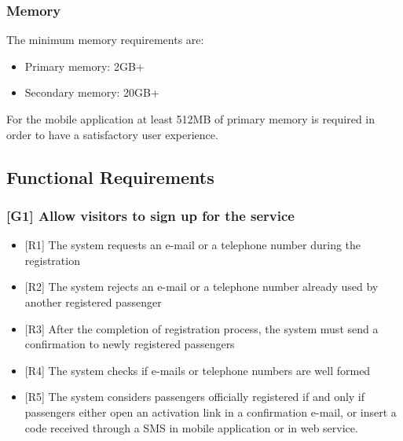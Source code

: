 \documentclass[a4paper,12pt]{article}%
\begin{document}
\subsubsection{Memory}
The minimum memory requirements are:
\begin{itemize}
\item Primary memory: 2GB+
\item Secondary memory: 20GB+
\end{itemize}
For the mobile application at least 512MB of primary memory is required in order to have a satisfactory user experience.
\subsection{Functional Requirements}
\subsubsection{{[}G1{]} Allow visitors to sign up for the service}
\label{goal1}
\begin{itemize}
\item {[}R1{]} The system requests an e-mail or a telephone number during the registration
\item {[}R2{]} The system rejects an e-mail or a telephone number already used by another registered passenger
\item {[}R3{]} After the completion of registration process, the system must send a confirmation to newly registered passengers
\item {[}R4{]} The system checks if e-mails or telephone numbers are well formed
\item {[}R5{]} The system considers passengers officially registered if and only if passengers either open an activation link in a confirmation e-mail, or insert a code received through a SMS in mobile application or in web service.
\end{itemize}
\end{document}
